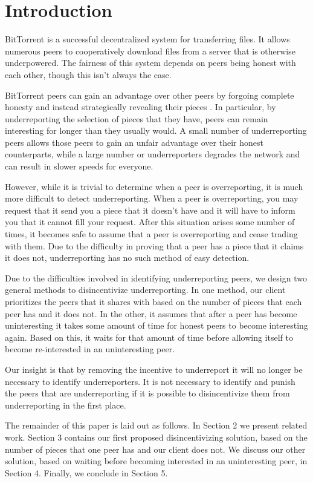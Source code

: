 \section{Introduction}

BitTorrent is a successful decentralized system for transferring files. It allows numerous peers to cooperatively download files from a server that is otherwise underpowered. The fairness of this system depends on peers being honest with each other, though this isn't always the case.

BitTorrent peers can gain an advantage over other peers by forgoing complete honesty and instead strategically revealing their pieces \cite{dlbittorrent}. In particular, by underreporting the selection of pieces that they have, peers can remain interesting for longer than they usually would. A small number of underreporting peers allows those peers to gain an unfair advantage over their honest counterparts, while a large number or underreporters degrades the network and can result in slower speeds for everyone.

However, while it is trivial to determine when a peer is overreporting, it is much more difficult to detect underreporting. When a peer is overreporting, you may request that it send you a piece that it doesn't have and it will have to inform you that it cannot fill your request. After this situation arises some number of times, it becomes safe to assume that a peer is overreporting and cease trading with them. Due to the difficulty in proving that a peer has a piece that it claims it does not, underreporting has no such method of easy detection.

Due to the difficulties involved in identifying underreporting peers, we design two general methods to disincentivize underreporting. In one method, our client prioritizes the peers that it shares with based on the number of pieces that each peer has and it does not. In the other, it assumes that after a peer has become uninteresting it takes some amount of time for honest peers to become interesting again. Based on this, it waits for that amount of time before allowing itself to become re-interested in an uninteresting peer.

Our insight is that by removing the incentive to underreport it will no longer be necessary to identify underreporters. It is not necessary to identify and punish the peers that are underreporting if it is possible to disincentivize them from underreporting in the first place.

The remainder of this paper is laid out as follows. In Section 2 we present related work. Section 3 contains our first proposed disincentivizing solution, based on the number of pieces that one peer has and our client does not. We discuss our other solution, based on waiting before becoming interested in an uninteresting peer, in Section 4. Finally, we conclude in Section 5.

